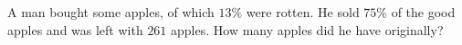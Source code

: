 A man bought some apples, of which $13\%$ were rotten. He sold $75\%$ of the good apples and was left with $261$ apples. How many apples did he have originally?
